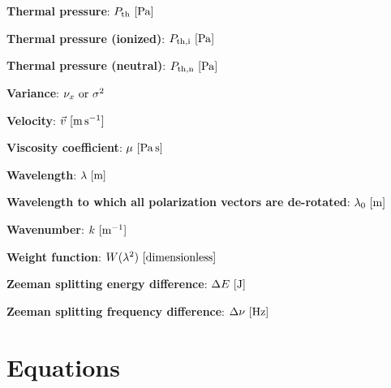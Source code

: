 \documentclass[a4paper,10pt]{article}
\begin{document}
{\noindent}\textbf{Thermal pressure}: $P_{\rm th} ~ [{\rm Pa}]$

{\noindent}\textbf{Thermal pressure (ionized)}: $P_{\rm th,i} ~ [{\rm Pa}]$

{\noindent}\textbf{Thermal pressure (neutral)}: $P_{\rm th,n} ~ [{\rm Pa}]$

{\noindent}\textbf{Variance}: $\nu_x~{\rm or}~\sigma^2$

{\noindent}\textbf{Velocity}: $\vec{v} ~ [{\rm m\,s^{-1}}]$

{\noindent}\textbf{Viscosity coefficient}: $\mu ~ [{\rm Pa\,s}]$

{\noindent}\textbf{Wavelength}: $\lambda~[{\rm m}]$

{\noindent}\textbf{Wavelength to which all polarization vectors are de-rotated}: $\lambda_0~[{\rm m}]$

{\noindent}\textbf{Wavenumber}: $k~[{\rm m^{-1}}]$

{\noindent}\textbf{Weight function}: $W(\lambda^2)~[\rm{dimensionless}]$

{\noindent}\textbf{Zeeman splitting energy difference}: $\Delta E ~ [{\rm J}]$

{\noindent}\textbf{Zeeman splitting frequency difference}: $\Delta \nu ~ [{\rm Hz}]$









































\newpage
\section{Equations}
\end{document}
